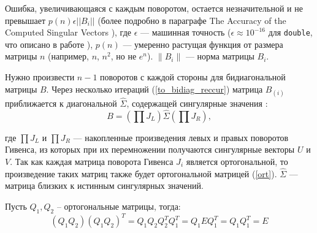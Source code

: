 \begin{note}
Ошибка, увеличивающаяся с каждым поворотом, остается незначительной и не превышает $p(n) \epsilon ||B_i||$ (более подробно в параграфе The Accuracy of the Computed Singular Vectors \cite{Demmel1990}), где  \( \epsilon \) — машинная точность (\( \epsilon \approx 10^{-16} \) для \texttt{double}, что описано в работе \cite[стр. 94-95]{Golub2013}), \( p(n) \) — умеренно растущая функция от размера матрицы \( n \) (например, \( n \), \( n^2 \), но не \( e^n \)). \( \|B_i\| \) — норма матрицы \( B_i \).
\end{note}

Нужно произвести \( n-1 \) поворотов с каждой стороны для бидиагональной матрицы \( B \). Через несколько итераций (\ref{to_bidiag_reccur}) матрица \( B_{(i)} \) приближается к диагональной \( \widehat{\Sigma} \), содержащей сингулярные значения \cite[стр. 11]{Demmel1990}:
\begin{equation}
B = \left( \prod J_L \right) \widehat{\Sigma} \left( \prod J_R \right),
\end{equation}

где \( \prod J_L \) и \( \prod J_R \) — накопленные произведения левых и правых поворотов Гивенса, из которых при их перемножении получаются сингулярные векторы \( U \) и \( V \). Так как каждая матрица поворота Гивенса $J_i$ является ортогональной, то произведение таких матриц также будет ортогональной матрицей (\ref{ort}). $\widehat{\Sigma}$ — матрица близких к истинным сингулярных значений.
\begin{claim} 
    Пусть $Q_1, Q_2$ -- ортогональные матрицы, тогда: 
    \begin{equation} \label{ort}
        (Q_1Q_2)(Q_1Q_2)^T=Q_1Q_2Q_2^TQ_1^T=Q_1EQ_1^T=Q_1Q_1^T=E
    \end{equation}
\end{claim}



